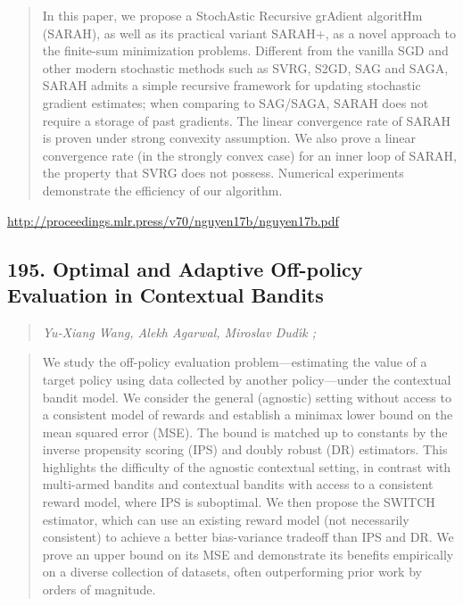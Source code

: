 \documentclass{article}
\begin{document}
\begin{quote}
    In this paper, we propose a StochAstic Recursive grAdient algoritHm (SARAH), as well as its practical variant SARAH+, as a novel approach to the finite-sum minimization problems. Different from the vanilla SGD and other modern stochastic methods such as SVRG, S2GD, SAG and SAGA, SARAH admits a simple recursive framework for updating stochastic gradient estimates; when comparing to SAG/SAGA, SARAH does not require a storage of past gradients. The linear convergence rate of SARAH is proven under strong convexity assumption. We also prove a linear convergence rate (in the strongly convex case) for an inner loop of SARAH, the property that SVRG does not possess. Numerical experiments demonstrate the efficiency of our algorithm.  
\end{quote}

\href{http://proceedings.mlr.press/v70/nguyen17b/nguyen17b.pdf}{http://proceedings.mlr.press/v70/nguyen17b/nguyen17b.pdf}

\subsection{195. Optimal and Adaptive Off-policy Evaluation in Contextual Bandits}

\begin{quote}
\footnotesize{\textit{Yu-Xiang Wang, Alekh Agarwal, Miroslav Dudı́k ;}}

\end{quote}

\begin{quote}
    We study the off-policy evaluation problem—estimating the value of a target policy using data collected by another policy—under the contextual bandit model. We consider the general (agnostic) setting without access to a consistent model of rewards and establish a minimax lower bound on the mean squared error (MSE). The bound is matched up to constants by the inverse propensity scoring (IPS) and doubly robust (DR) estimators. This highlights the difficulty of the agnostic contextual setting, in contrast with multi-armed bandits and contextual bandits with access to a consistent reward model, where IPS is suboptimal. We then propose the SWITCH estimator, which can use an existing reward model (not necessarily consistent) to achieve a better bias-variance tradeoff than IPS and DR. We prove an upper bound on its MSE and demonstrate its benefits empirically on a diverse collection of datasets, often outperforming prior work by orders of magnitude.  
\end{quote}
\end{document}
